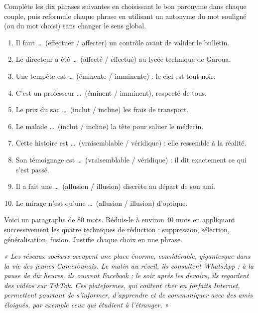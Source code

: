 \documentclass[11pt]{article}
\newcommand{\cle}[1]{{\popxbold\color{popdark}#1}}
\begin{document}
\begin{exercice}
Complète les dix phrases suivantes en choisissant le bon paronyme dans chaque couple, puis reformule chaque phrase en utilisant un \cle{antonyme} du mot souligné (ou du mot choisi) sans changer le sens global.
\begin{enumerate}
\item Il faut \dots\ (effectuer / affecter) un contrôle avant de valider le bulletin.
\item Le directeur a été \dots\ (affecté / effectué) au lycée technique de Garoua.
\item Une tempête est \dots\ (éminente / imminente) : le ciel est tout noir.
\item C'est un professeur \dots\ (éminent / imminent), respecté de tous.
\item Le prix du sac \dots\ (inclut / incline) les frais de transport.
\item Le malade \dots\ (inclut / incline) la tête pour saluer le médecin.
\item Cette histoire est \dots\ (vraisemblable / véridique) : elle ressemble à la réalité.
\item Son témoignage est \dots\ (vraisemblable / véridique) : il dit exactement ce qui s'est passé.
\item Il a fait une \dots\ (allusion / illusion) discrète au départ de son ami.
\item Le mirage n'est qu'une \dots\ (allusion / illusion) d'optique.
\end{enumerate}
\end{exercice}

\begin{exercice}
Voici un paragraphe de 80 mots. Réduis-le à environ 40 mots en appliquant successivement les quatre techniques de réduction : suppression, sélection, généralisation, fusion. Justifie chaque choix en une phrase.

\emph{« Les réseaux sociaux occupent une place énorme, considérable, gigantesque dans la vie des jeunes Camerounais. Le matin au réveil, ils consultent WhatsApp ; à la pause de dix heures, ils ouvrent Facebook ; le soir après les devoirs, ils regardent des vidéos sur TikTok. Ces plateformes, qui coûtent cher en forfaits Internet, permettent pourtant de s'informer, d'apprendre et de communiquer avec des amis éloignés, par exemple ceux qui étudient à l'étranger. »}
\end{exercice}
\end{document}
